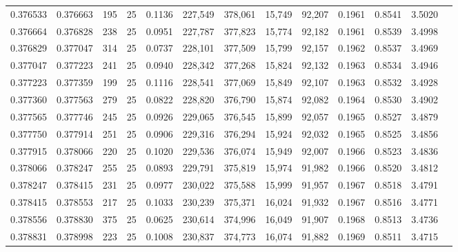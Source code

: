 \begin{tabular}{rrrrrrrrrrrrr}
0.376533 & 0.376663 &   195 &  25 &                                     0.1136 & 227,549 & 378,061 &  15,749 &  92,207 & 0.1961 & 0.8541 & 3.5020 \\
0.376664 & 0.376828 &   238 &  25 &                                     0.0951 & 227,787 & 377,823 &  15,774 &  92,182 & 0.1961 & 0.8539 & 3.4998 \\
0.376829 & 0.377047 &   314 &  25 &                                     0.0737 & 228,101 & 377,509 &  15,799 &  92,157 & 0.1962 & 0.8537 & 3.4969 \\
0.377047 & 0.377223 &   241 &  25 &                                     0.0940 & 228,342 & 377,268 &  15,824 &  92,132 & 0.1963 & 0.8534 & 3.4946 \\
0.377223 & 0.377359 &   199 &  25 &                                     0.1116 & 228,541 & 377,069 &  15,849 &  92,107 & 0.1963 & 0.8532 & 3.4928 \\
0.377360 & 0.377563 &   279 &  25 &                                     0.0822 & 228,820 & 376,790 &  15,874 &  92,082 & 0.1964 & 0.8530 & 3.4902 \\
0.377565 & 0.377746 &   245 &  25 &                                     0.0926 & 229,065 & 376,545 &  15,899 &  92,057 & 0.1965 & 0.8527 & 3.4879 \\
0.377750 & 0.377914 &   251 &  25 &                                     0.0906 & 229,316 & 376,294 &  15,924 &  92,032 & 0.1965 & 0.8525 & 3.4856 \\
0.377915 & 0.378066 &   220 &  25 &                                     0.1020 & 229,536 & 376,074 &  15,949 &  92,007 & 0.1966 & 0.8523 & 3.4836 \\
0.378066 & 0.378247 &   255 &  25 &                                     0.0893 & 229,791 & 375,819 &  15,974 &  91,982 & 0.1966 & 0.8520 & 3.4812 \\
0.378247 & 0.378415 &   231 &  25 &                                     0.0977 & 230,022 & 375,588 &  15,999 &  91,957 & 0.1967 & 0.8518 & 3.4791 \\
0.378415 & 0.378553 &   217 &  25 &                                     0.1033 & 230,239 & 375,371 &  16,024 &  91,932 & 0.1967 & 0.8516 & 3.4771 \\
0.378556 & 0.378830 &   375 &  25 &                                     0.0625 & 230,614 & 374,996 &  16,049 &  91,907 & 0.1968 & 0.8513 & 3.4736 \\
0.378831 & 0.378998 &   223 &  25 &                                     0.1008 & 230,837 & 374,773 &  16,074 &  91,882 & 0.1969 & 0.8511 & 3.4715 \\

\end{tabular}
